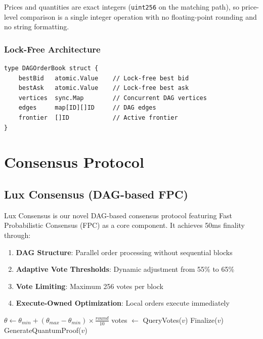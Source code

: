 \documentclass[11pt,a4paper]{article}
\begin{document}
Prices and quantities are exact integers (\texttt{uint256} on the matching
path), so price-level comparison is a single integer operation with no
floating-point rounding and no string formatting.

\subsubsection{Lock-Free Architecture}
\begin{lstlisting}
type DAGOrderBook struct {
    bestBid   atomic.Value    // Lock-free best bid
    bestAsk   atomic.Value    // Lock-free best ask
    vertices  sync.Map        // Concurrent DAG vertices
    edges     map[ID][]ID     // DAG edges
    frontier  []ID            // Active frontier
}
\end{lstlisting}

\section{Consensus Protocol}

\subsection{Lux Consensus (DAG-based FPC)}

Lux Consensus is our novel DAG-based consensus protocol featuring Fast Probabilistic Consensus (FPC) as a core component. It achieves 50ms finality through:

\begin{enumerate}
    \item \textbf{DAG Structure}: Parallel order processing without sequential blocks
    \item \textbf{Adaptive Vote Thresholds}: Dynamic adjustment from 55\% to 65\%
    \item \textbf{Vote Limiting}: Maximum 256 votes per block
    \item \textbf{Execute-Owned Optimization}: Local orders execute immediately
\end{enumerate}

\begin{algorithm}
\caption{Lux Consensus Round}
\begin{algorithmic}
\STATE $\theta \gets \theta_{min} + (\theta_{max} - \theta_{min}) \times \frac{round}{10}$
    \STATE votes $\gets$ QueryVotes($v$)
        \STATE Finalize($v$)
        \STATE GenerateQuantumProof($v$)
    \ENDIF
\ENDFOR
\end{algorithmic}
\end{algorithm}
\end{document}
